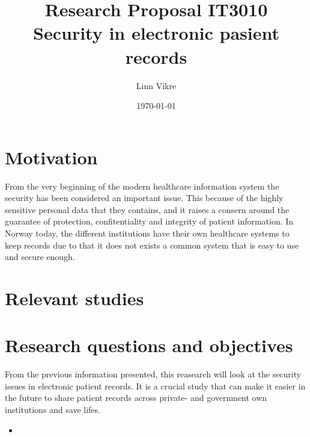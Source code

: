 \documentclass[11pt, a4paper]{article}
\title{Research Proposal IT3010\\ Security in electronic pasient records}
\author{Linn Vikre}
\date{\today}
\begin{document}
\maketitle
\section{Motivation}
From the very beginning of the modern healthcare information system the security has been considered an important issue. This because of the highly sensitive personal data that they contains, and it raises a consern around the guarantee of protection, confitentiality and integrity of patient information\cite{Smith199939}. In Norway today, the different institutions have their own healthcare systems to keep records due to that it does not exists a common system that is easy to use and secure enough.



%
\section{Relevant studies}

\section{Research questions and objectives}

From the previous information presented, this reasearch will look at the security issues in electronic patient records. It is a crucial study that can make it easier in the future to share patient records across private- and government own institutions and save lifes. 

\begin{itemize}
\item 
\end{itemize}


\end{document}
